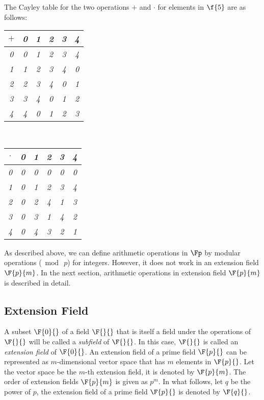 \begin{example}The Cayley table for the two operations $+$ and $\cdot$ for elements in $\f{5}$ are as follows:
\begin{center}
\begin{tabular}{c|ccccc}
        $+$&\em 0&\em 1&\em 2&\em 3&\em 4       \\
\hline
        \em 0&\em 0&\em 1&\em 2&\em 3&\em 4       \\
        \em 1&\em 1&\em 2&\em 3&\em 4&\em 0      \\
        \em 2&\em 2&\em 3&\em 4&\em 0&\em 1      \\
        \em 3&\em 3&\em 4&\em 0&\em 1&\em 2      \\
        \em 4&\em 4&\em 0&\em 1&\em 2&\em 3      \\
\end{tabular}\ \ 
\begin{tabular}{c|ccccc}
        $\cdot$&\em 0&\em 1&\em 2&\em 3&\em 4       \\
\hline
        \em 0&\em 0&\em 0&\em 0&\em 0&\em 0       \\
        \em 1&\em 0&\em 1&\em 2&\em 3&\em 4      \\
        \em 2&\em 0&\em 2&\em 4&\em 1&\em 3      \\
        \em 3&\em 0&\em 3&\em 1&\em 4&\em 2      \\
        \em 4&\em 0&\em 4&\em 3&\em 2&\em 1      \\
\end{tabular}
\end{center}
\end{example}
As described above, we can define arithmetic operations in $\Fp$ by modular operations ($\bmod\ p$) for integers. However, it does not work in an extension field $\F{p}{m}$. In the next section, arithmetic operations in extension field $\F{p}{m}$ is described in detail.

\subsection{Extension Field}

A subset $\F{0}{}$ of a field $\F{}{}$ that is itself a field under the operations of $\F{}{}$ will be called a {\it subfield} of $\F{}{}$.
In this case, $\F{}{}$ is called an {\it extension field} of $\F{0}{}$.
An extension field of a prime field $\F{p}{}$ can be represented as $m$-dimensional vector space that has $m$ elements in $\F{p}{}$.
Let the vector space be the $m$-th extension field, it is denoted by $\F{p}{m}$.
The order of extension fields $\F{p}{m}$ is given as $p^m$. 
In what follows, let $q$ be the power of $p$, the extension field of a prime field $\F{p}{}$ is denoted by $\F{q}{}$.

